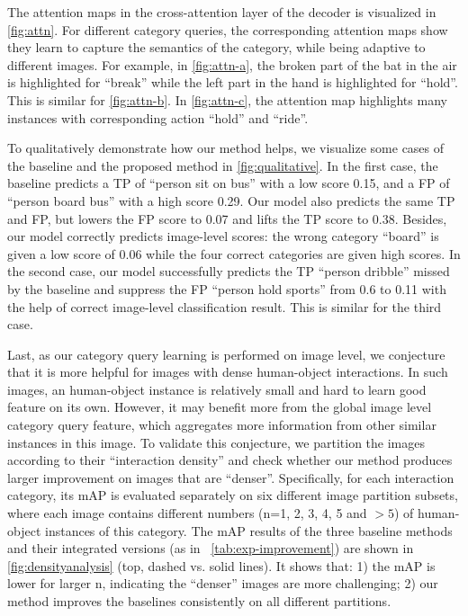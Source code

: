 \documentclass[10pt,twocolumn,letterpaper]{article}
\begin{document}
The attention maps in the cross-attention layer of the decoder is visualized in \cref{fig:attn}. For different category queries, the corresponding attention maps show they learn to capture the semantics of the category, while being adaptive to different images. For example, in \cref{fig:attn-a}, the broken part of the bat in the air is highlighted for ``break'' while the left part in the hand is highlighted for ``hold''. This is similar for \cref{fig:attn-b}. In \cref{fig:attn-c}, the attention map highlights many instances with corresponding action ``hold'' and ``ride''.

To qualitatively demonstrate how our method helps, we visualize some cases of the baseline and the proposed method in \cref{fig:qualitative}. In the first case, the baseline predicts a TP of ``person sit on bus'' with a low score 0.15, and a FP of ``person board bus'' with a high score 0.29. Our model also predicts the same TP and FP, but lowers the FP score to 0.07 and lifts the TP score to 0.38. Besides, our model correctly predicts image-level scores: the wrong category ``board'' is given a low score of 0.06 while the four correct categories are given high scores.
In the second case, our model successfully predicts the TP ``person dribble'' missed by the baseline and suppress the FP ``person hold sports'' from 0.6 to 0.11 with the help of correct image-level classification result. This is similar for the third case.


Last, as our category query learning is performed on image level, we conjecture that it is more helpful for images with dense human-object interactions. In such images, an human-object instance is relatively small and hard to learn good feature on its own. However, it may benefit more from the global image level category query feature, which aggregates more information from other similar instances in this image. To validate this conjecture, we partition the images according to their ``interaction density'' and check whether our method produces larger improvement on images that are ``denser''. Specifically, for each interaction category, its mAP is evaluated separately on six different image partition subsets, where each image contains different numbers (n=1, 2, 3, 4, 5 and $>5$) of human-object instances of this category. The mAP results of the three baseline methods and their integrated versions (as in ~\cref{tab:exp-improvement}) are shown in \cref{fig:densityanalysis} (top, dashed vs. solid lines). It shows that: 1) the mAP is lower for larger n, indicating the ``denser'' images are more challenging; 2) our method improves the baselines consistently on all different partitions.
\end{document}
